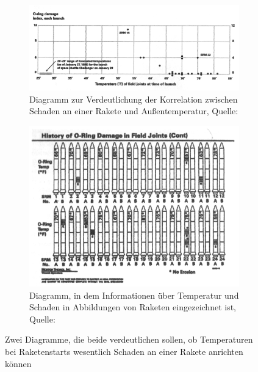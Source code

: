 \documentclass[12pt, a4paper]{article}
\begin{document}
\begin{figure}[h!]
\centering
\begin{subfigure}[b]{0.9\textwidth}
\includegraphics[width=\textwidth]{ORing_good.png}
\caption[Diagramm zur Verdeutlichung der Korrelation zwischen Schaden an einer Rakete und Außentemperatur]{Diagramm zur Verdeutlichung der Korrelation zwischen Schaden an einer Rakete und Außentemperatur, Quelle: \protect{}}
\label{ORing_good}
\end{subfigure}
\begin{subfigure}[b]{0.9\textwidth}
\includegraphics[width=\textwidth]{ORing_bad.png}
\caption[Diagramm, in dem Informationen über Temperatur und Schaden in Abbildungen von Raketen eingezeichnet ist]{Diagramm, in dem Informationen über Temperatur und Schaden in Abbildungen von Raketen eingezeichnet ist, Quelle: \protect{}}
\label{ORing_bad}
\end{subfigure}
\caption{Zwei Diagramme, die beide verdeutlichen sollen, ob Temperaturen bei Raketenstarts wesentlich Schaden an einer Rakete anrichten können}
\end{figure}
\end{document}
